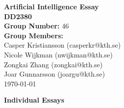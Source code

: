 \documentclass[12pt]{article}
\begin{document}
\begin{titlepage}
    \centering
    \vspace*{60pt}
    \Huge
    \textbf{Artificial Intelligence Essay \\ DD2380}\\
    \vspace{30pt}
    \Large
    \textbf{Group Number:} 46\\
    \vspace{10pt}
    \large
    \textbf{Group Members:}\\
    \vspace{10pt}
    Casper Kristiansson (casperkr@kth.se)\\
    Nicole Wijkman (nwijkman@kth.se)\\
    Zongkai Zhang (zongkai@kth.se)\\
    Joar Gunnarsson (joargu@kth.se)\\
    \vfill
    \large
    \today
\end{titlepage}


\newpage
\begin{center}
    \huge
    \textbf{Individual Essays}
\end{center}
\end{document}
